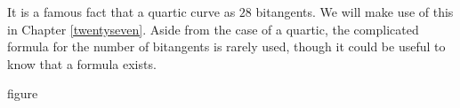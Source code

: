 \documentclass[leqno]{book}
\theoremstyle{definition}%
\numberwithin{equation}{section}
\theoremstyle{theorem} %
\begin{document}
\newpage
\msno 
It is a famous fact that a quartic  curve as $28$
bitangents.  We will make use of this  in Chapter \ref{twentyseven}.
Aside from the case of a quartic, the complicated formula for the
number of bitangents is rarely used, though it could be useful to know
that a formula exists.


\bs
\centerline{figure}

%
\end{document}
